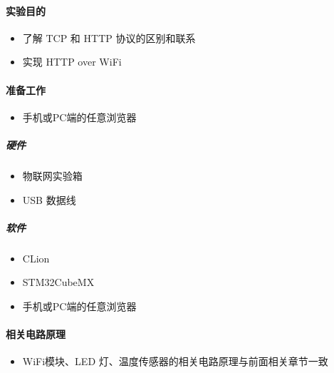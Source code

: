 \documentclass[a4paper,12pt,english]{sphinxmanual}
\begin{document}
\paragraph{实验目的}
\label{\detokenize{exp-stm32/wifi/http-over-wifi:id1}}\begin{itemize}
\item {} 
\sphinxAtStartPar
了解 TCP 和 HTTP 协议的区别和联系

\item {} 
\sphinxAtStartPar
实现 HTTP over WiFi

\end{itemize}


\paragraph{准备工作}
\label{\detokenize{exp-stm32/wifi/http-over-wifi:id2}}\begin{itemize}
\item {} 
\sphinxAtStartPar
手机或PC端的任意浏览器

\end{itemize}


\subparagraph{硬件}
\label{\detokenize{exp-stm32/wifi/http-over-wifi:id3}}\begin{itemize}
\item {} 
\sphinxAtStartPar
物联网实验箱

\item {} 
\sphinxAtStartPar
USB 数据线

\end{itemize}


\subparagraph{软件}
\label{\detokenize{exp-stm32/wifi/http-over-wifi:id4}}\begin{itemize}
\item {} 
\sphinxAtStartPar
CLion

\item {} 
\sphinxAtStartPar
STM32CubeMX

\item {} 
\sphinxAtStartPar
手机或PC端的任意浏览器

\end{itemize}


\paragraph{相关电路原理}
\label{\detokenize{exp-stm32/wifi/http-over-wifi:id5}}\begin{itemize}
\item {} 
\sphinxAtStartPar
WiFi模块、LED 灯、温度传感器的相关电路原理与前面相关章节一致

\end{itemize}
\end{document}
